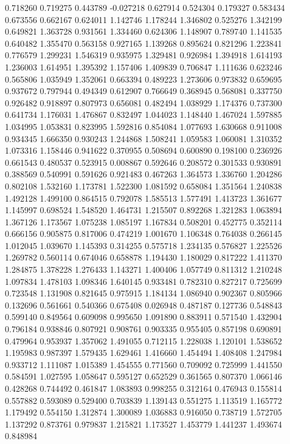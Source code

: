 0.718260
0.719275
0.443789
-0.027218
0.627914
0.524304
0.179327
0.583434
0.673556
0.662167
0.624011
1.142746
1.178244
1.346802
0.525276
1.342199
0.649821
1.363728
0.931561
1.334460
0.624306
1.148907
0.789740
1.141535
0.640482
1.355470
0.563158
0.927165
1.139268
0.895624
0.821296
1.223841
0.776579
1.299231
1.546319
0.935975
1.329481
0.926984
1.394918
1.614193
1.236003
1.614951
1.395392
1.157406
1.409839
0.706847
1.111636
0.623246
0.565806
1.035949
1.352061
0.663394
0.489223
1.273606
0.973832
0.659695
0.937672
0.797944
0.494349
0.612907
0.766649
0.368945
0.568081
0.337750
0.926482
0.918897
0.807973
0.656081
0.482494
1.038929
1.174376
0.737300
0.641734
1.176031
1.476867
0.832497
1.044023
1.148440
1.467024
1.597885
1.034995
1.053831
0.823995
1.592816
0.854084
1.077693
1.630668
0.911008
0.934345
1.666350
0.930243
1.244868
1.508241
1.059583
1.060081
1.310352
1.073316
1.158446
0.941622
0.370955
0.508694
0.600890
0.198100
0.236926
0.661543
0.480537
0.523915
0.008867
0.592646
0.208572
0.301533
0.930891
0.388569
0.540991
0.591626
0.921483
0.467263
1.364573
1.336760
1.204286
0.802108
1.532160
1.173781
1.522300
1.081592
0.658084
1.351564
1.240838
1.492128
1.499100
0.864515
0.792078
1.585513
1.577491
1.413723
1.361677
1.145997
0.698524
1.548520
1.464731
1.215507
0.892268
1.321283
1.063894
1.367126
1.173567
1.075238
1.085197
1.167834
0.508201
0.452775
0.352114
0.666156
0.905875
0.817006
0.474219
1.001670
1.106348
0.764038
0.266145
1.012045
1.039670
1.145393
0.314255
0.575718
1.234135
0.576827
1.225526
1.269782
0.560114
0.674046
0.658878
1.194430
1.180029
0.817222
1.411370
1.284875
1.378228
1.276433
1.143271
1.400406
1.057749
0.811312
1.210248
1.097834
1.478103
1.098346
1.640145
0.933481
0.782310
0.827217
0.725699
0.723548
1.131908
0.821645
0.975915
1.184134
1.086940
0.902367
0.805966
0.132696
0.561661
0.540366
0.675408
0.026948
0.487187
0.127736
0.548843
0.599140
0.849564
0.609098
0.995650
1.091890
0.883911
0.571540
1.432904
0.796184
0.938846
0.807921
0.908761
0.903335
0.955405
0.857198
0.690891
0.479964
0.953937
1.357062
1.491055
0.712115
1.228038
1.120101
1.538652
1.195983
0.987397
1.579435
1.629461
1.416660
1.454494
1.408408
1.247984
0.933712
1.111087
1.015389
1.454555
0.771560
0.709092
0.725999
1.441550
0.584591
1.027595
1.058647
0.595127
0.652529
0.361565
0.807370
1.066146
0.428268
0.744492
0.461847
1.083893
0.998255
0.312164
0.476943
0.155814
0.557882
0.593089
0.529400
0.703839
1.139143
0.551275
1.113519
1.165772
1.179492
0.554150
1.312874
1.300089
1.036883
0.916050
0.738719
1.572705
1.137292
0.873761
0.979837
1.215821
1.173527
1.453779
1.441237
1.493674
0.848984
